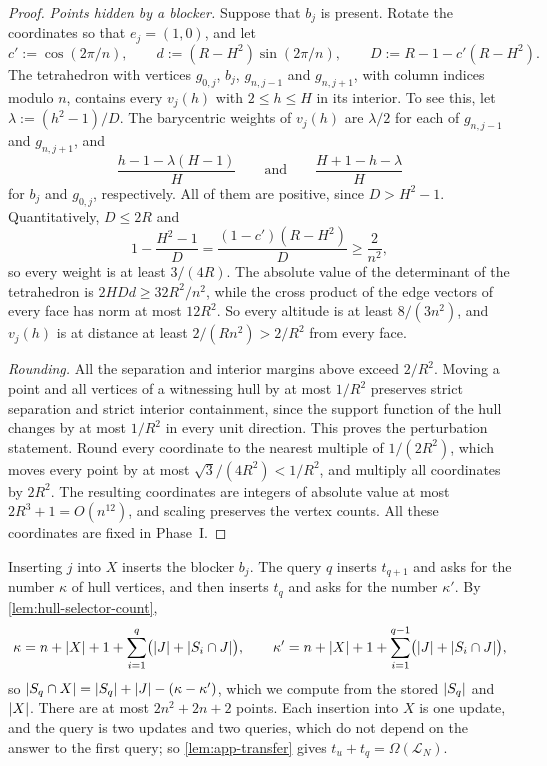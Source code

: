 \begin{proof}
\smallskip\noindent\emph{Points hidden by a blocker.} Suppose that $b_j$ is present. Rotate the coordinates so that $e_j=(1,0)$, and let
\[
 c':=\cos(2\pi/n),\qquad d:=(R-H^2)\sin(2\pi/n),\qquad
 D:=R-1-c'(R-H^2).
\]
The tetrahedron with vertices $g_{0,j}$, $b_j$, $g_{n,j-1}$ and $g_{n,j+1}$, with column indices modulo $n$, contains every $v_j(h)$ with $2\le h\le H$ in its interior. To see this, let $\lambda:=(h^2-1)/D$. The barycentric weights of $v_j(h)$ are $\lambda/2$ for each of $g_{n,j-1}$ and $g_{n,j+1}$, and
\[
 \frac{h-1-\lambda(H-1)}H
 \qquad\text{and}\qquad
 \frac{H+1-h-\lambda}H
\]
for $b_j$ and $g_{0,j}$, respectively. All of them are positive, since $D>H^2-1$. Quantitatively, $D\le2R$ and
\[
 1-\frac{H^2-1}{D}
 =\frac{(1-c')(R-H^2)}D\ge\frac2{n^2},
\]
so every weight is at least $3/(4R)$. The absolute value of the determinant of the tetrahedron is $2HDd\ge32R^2/n^2$, while the cross product of the edge vectors of every face has norm at most $12R^2$. So every altitude is at least $8/(3n^2)$, and $v_j(h)$ is at distance at least $2/(Rn^2)>2/R^2$ from every face.

\smallskip\noindent\emph{Rounding.} All the separation and interior margins above exceed $2/R^2$. Moving a point and all vertices of a witnessing hull by at most $1/R^2$ preserves strict separation and strict interior containment, since the support function of the hull changes by at most $1/R^2$ in every unit direction. This proves the perturbation statement. Round every coordinate to the nearest multiple of $1/(2R^2)$, which moves every point by at most $\sqrt3/(4R^2)<1/R^2$, and multiply all coordinates by $2R^2$. The resulting coordinates are integers of absolute value at most $2R^3+1=O(n^{12})$, and scaling preserves the vertex counts. All these coordinates are fixed in Phase~I.
\end{proof}

Inserting $j$ into $X$ inserts the blocker $b_j$. The query $q$ inserts $t_{q+1}$ and asks for the number $\kappa$ of hull vertices, and then inserts $t_q$ and asks for the number $\kappa'$. By \cref{lem:hull-selector-count},
\[
 \kappa=n+\left|X\right|+1+\sum_{i=1}^{q}\bigl(\left|J\right|+\left|S_i\cap J\right|\bigr),\qquad
 \kappa'=n+\left|X\right|+1+\sum_{i=1}^{q-1}\bigl(\left|J\right|+\left|S_i\cap J\right|\bigr),
\]
so $\left|S_q\cap X\right|=\left|S_q\right|+\left|J\right|-(\kappa-\kappa')$, which we compute from the stored $\left|S_q\right|$ and $\left|X\right|$. There are at most $2n^2+2n+2$ points. Each insertion into $X$ is one update, and the query is two updates and two queries, which do not depend on the answer to the first query; so \cref{lem:app-transfer} gives $t_u+t_q=\Omega(\mathcal L_N)$.

